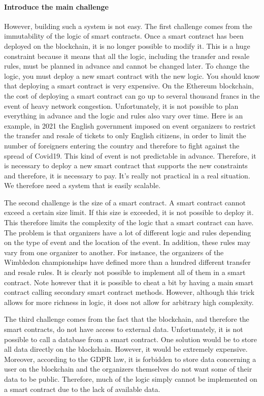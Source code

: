 \documentclass[a4paper,11pt,oneside]{report}
\begin{document}
\paragraph{Introduce the main challenge} However, building such a system is not easy. The first challenge comes from the immutability of the logic of smart contracts. Once a smart contract has been deployed on the blockchain, it is no longer possible to modify it. This is a huge constraint because it means that all the logic, including the transfer and resale rules, must be planned in advance and cannot be changed later. To change the logic, you must deploy a new smart contract with the new logic. You should know that deploying a smart contract is very expensive. On the Ethereum blockchain, the cost of deploying a smart contract can go up to several thousand francs in the event of heavy network congestion. Unfortunately, it is not possible to plan everything in advance and the logic and rules also vary over time. Here is an example, in 2021 the English government imposed on event organizers to restrict the transfer and resale of tickets to only English citizens, in order to limit the number of foreigners entering the country and therefore to fight against the spread of Covid19. This kind of event is not predictable in advance. Therefore, it is necessary to deploy a new smart contract that supports the new constraints and therefore, it is necessary to pay. It's really not practical in a real situation. We therefore need a system that is easily scalable.

The second challenge is the size of a smart contract. A smart contract cannot exceed a certain size limit. If this size is exceeded, it is not possible to deploy it. This therefore limits the complexity of the logic that a smart contract can have. The problem is that organizers have a lot of different logic and rules depending on the type of event and the location of the event. In addition, these rules may vary from one organizer to another. For instance, the organizers of the Wimbledon championships have defined more than a hundred different transfer and resale rules. It is clearly not possible to implement all of them in a smart contract. Note however that it is possible to cheat a bit by having a main smart contract calling secondary smart contract methods. However, although this trick allows for more richness in logic, it does not allow for arbitrary high complexity.

The third challenge comes from the fact that the blockchain, and therefore the smart contracts, do not have access to external data. Unfortunately, it is not possible to call a database from a smart contract. One solution would be to store all data directly on the blockchain. However, it would be extremely expensive. Moreover, according to the GDPR law, it is forbidden to store data concerning a user on the blockchain and the organizers themselves do not want some of their data to be public. Therefore, much of the logic simply cannot be implemented on a smart contract due to the lack of available data.
\end{document}
